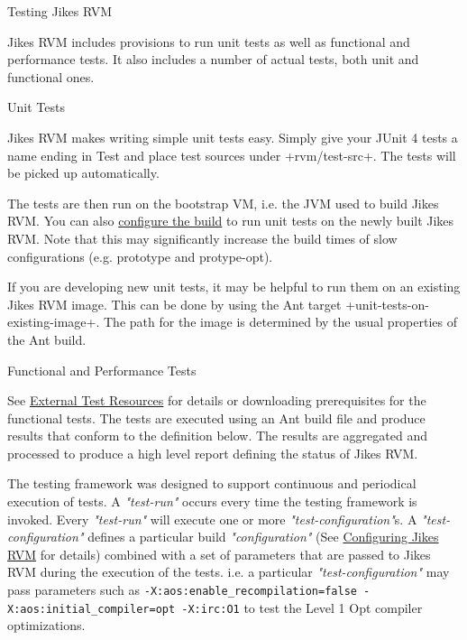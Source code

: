 \begin{chapter}{Testing Jikes RVM}
\label{cha:testingjikesrvm}

Jikes RVM includes provisions to run unit tests as well as functional and performance tests. It also includes a number of actual tests, both unit and functional ones.

\begin{section}{Unit Tests}

Jikes RVM makes writing simple unit tests easy. Simply give your JUnit 4 tests a name ending in Test and place test sources under \spverb+rvm/test-src+. The tests will be picked up automatically.

The tests are then run on the bootstrap VM, i.e. the JVM used to build Jikes RVM. You can also \hyperref[cha:buildingjikesrvm]{configure the build} to run unit tests on the newly built Jikes RVM. Note that this may significantly increase the build times of slow configurations (e.g. prototype and protype-opt).

If you are developing new unit tests, it may be helpful to run them on an existing Jikes RVM image. This can be done by using the Ant target \spverb+unit-tests-on-existing-image+. The path for the image is determined by the usual properties of the Ant build.
\end{section}

\begin{section}{Functional and Performance Tests}

See \hyperref[sec:externaltestresources]{External Test Resources} for details or downloading prerequisites for the functional tests. The tests are executed using an Ant build file and produce results that conform to the definition below. The results are aggregated and processed to produce a high level report defining the status of Jikes RVM.

The testing framework was designed to support continuous and periodical execution of tests. A \textit{"test-run"} occurs every time the testing framework is invoked. Every \textit{"test-run"} will execute one or more \textit{"test-configuration"}s. A \textit{"test-configuration"} defines a particular build \textit{"configuration"} (See \hyperref[cha:configuringjikesrvm]{Configuring Jikes RVM} for details) combined with a set of parameters that are passed to Jikes RVM during the execution of the tests. i.e. a particular \textit{"test-configuration"} may pass parameters such as \texttt{-X:aos:enable\_recompilation=false -X:aos:initial\_compiler=opt -X:irc:O1} to test the Level 1 Opt compiler optimizations.


\end{section}
\end{chapter}
